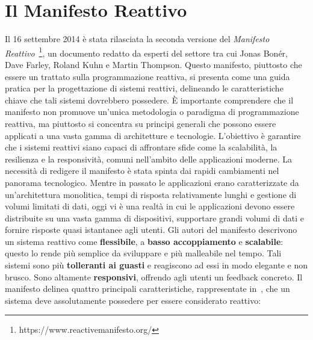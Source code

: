 \documentclass[12pt,a4paper,openright,twoside]{book}
\begin{document}
\section{Il Manifesto Reattivo}
Il 16 settembre 2014 è stata rilasciata la seconda versione del \textit{Manifesto Reattivo}~\footnote{https://www.reactivemanifesto.org/}, un documento redatto da esperti del settore tra cui Jonas Bonér, Dave Farley, Roland Kuhn e Martin Thompson. Questo manifesto, piuttosto che essere un trattato sulla programmazione reattiva, si presenta come una guida pratica per la progettazione di sistemi reattivi, delineando le caratteristiche chiave che tali sistemi dovrebbero possedere.
È importante comprendere che il manifesto non promuove un'unica metodologia o paradigma di programmazione reattiva, ma piuttosto si concentra su principi generali che possono essere applicati a una vasta gamma di architetture e tecnologie. L'obiettivo è garantire che i sistemi reattivi siano capaci di affrontare sfide come la scalabilità, la resilienza e la responsività, comuni nell'ambito delle applicazioni moderne.
La necessità di redigere il manifesto è stata spinta dai rapidi cambiamenti nel panorama tecnologico. Mentre in passato le applicazioni erano caratterizzate da un'architettura monolitica, tempi di risposta relativamente lunghi e gestione di volumi limitati di dati, oggi vi è una realtà in cui le applicazioni devono essere distribuite su una vasta gamma di dispositivi, supportare grandi volumi di dati e fornire risposte quasi istantanee agli utenti.
Gli autori del manifesto descrivono un sistema reattivo come \textbf{flessibile}, a \textbf{basso accoppiamento} e \textbf{scalabile}: questo lo rende più semplice da sviluppare e più malleabile nel tempo. Tali sistemi sono più \textbf{tolleranti ai guasti} e reagiscono ad essi in modo elegante e non brusco. Sono altamente \textbf{responsivi}, offrendo agli utenti un feedback concreto.
Il manifesto delinea quattro principali caratteristiche, rappresentate in~, che un sistema deve assolutamente possedere per essere considerato reattivo: 
\end{document}
